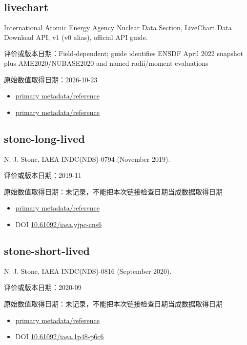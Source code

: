 \documentclass[
  11pt,
  letterpaper,
]{article}
\providecommand{\tightlist}{%
  \setlength{\itemsep}{0pt}\setlength{\parskip}{0pt}}
\begin{document}
\subsection{livechart}\label{livechart}

International Atomic Energy Agency Nuclear Data Section, LiveChart Data
Download API, v1 (v0 alias), official API guide.

评价或版本日期：Field-dependent; guide identifies ENSDF April 2022
snapshot plus AME2020/NUBASE2020 and named radii/moment evaluations

原始数值取得日期：2026-10-23

\begin{itemize}
\tightlist
\item
  \href{https://www-nds.iaea.org/relnsd/vcharthtml/api_v0_guide.html}{primary
  metadata/reference}
\item
  \href{https://nds.iaea.org/relnsd/v1/data}{primary metadata/reference}
\end{itemize}

\subsection{stone-long-lived}\label{stone-long-lived}

N. J. Stone, IAEA INDC(NDS)-0794 (November 2019).

评价或版本日期：2019-11

原始数值取得日期：未记录，不能把本次链接检查日期当成数据取得日期

\begin{itemize}
\tightlist
\item
  \href{https://nds.iaea.org/records/x2773-kj397}{primary
  metadata/reference}
\item
  DOI
  \href{https://doi.org/10.61092/iaea.yjpc-cns6}{10.61092/iaea.yjpc-cns6}
\end{itemize}

\subsection{stone-short-lived}\label{stone-short-lived}

N. J. Stone, IAEA INDC(NDS)-0816 (September 2020).

评价或版本日期：2020-09

原始数值取得日期：未记录，不能把本次链接检查日期当成数据取得日期

\begin{itemize}
\tightlist
\item
  \href{https://nds.iaea.org/records/5g7ec-evw90}{primary
  metadata/reference}
\item
  DOI
  \href{https://doi.org/10.61092/iaea.1p48-p6c6}{10.61092/iaea.1p48-p6c6}
\end{itemize}
\end{document}
